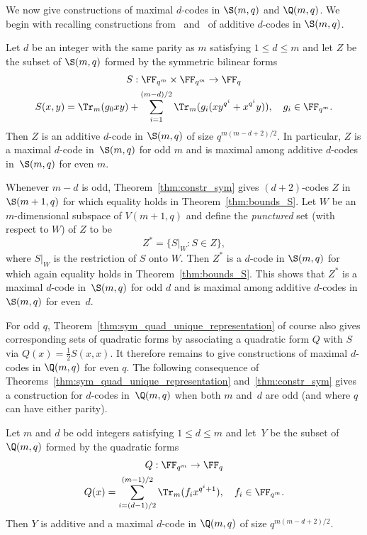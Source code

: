 We now give constructions of maximal $d$-codes in $\S(m,q)$ and $\Q(m,q)$. We begin with recalling constructions from~\cite{Sch2010} and~\cite{Sch2015} of additive $d$-codes in $\S(m,q)$.
\begin{theorem}
\label{thm:constr_sym}
Let $d$ be an integer with the same parity as $m$ satisfying $1\le d\le m$ and let $Z$ be the subset of $\S(m,q)$ formed by the symmetric bilinear forms
\begin{gather*}
S:\FF_{q^m}\times \FF_{q^m}\to\FF_q\\
S(x,y)=\Tr_m(g_0xy)+\sum_{i=1}^{(m-d)/2}\Tr_m(g_i(xy^{q^i}+x^{q^i}y)),\quad g_i\in\FF_{q^m}.
\end{gather*}
Then $Z$ is an additive $d$-code in $\S(m,q)$ of size $q^{m(m-d+2)/2}$. In particular, $Z$ is a maximal $d$-code in~$\S(m,q)$ for odd $m$ and is maximal among additive $d$-codes in~$\S(m,q)$ for even $m$.
\end{theorem}
\par
Whenever $m-d$ is odd, Theorem~\ref{thm:constr_sym} gives $(d+2)$-codes $Z$ in $\S(m+1,q)$ for which equality holds in Theorem~\ref{thm:bounds_S}. Let $W$ be an $m$-dimensional subspace of $V(m+1,q)$ and define the \emph{punctured} set (with respect to $W$) of $Z$ to be
\[
Z^*=\big\{S|_W:S\in Z\big\},
\] 
where $S|_W$ is the restriction of $S$ onto $W$. Then $Z^*$ is a $d$-code in $\S(m,q)$ for which again equality holds in Theorem~\ref{thm:bounds_S}. This shows that $Z^*$ is a maximal $d$-code in~$\S(m,q)$ for odd $d$ and is maximal among additive $d$-codes in~$\S(m,q)$ for even~$d$.
\par
For odd $q$, Theorem~\ref{thm:sym_quad_unique_representation} of course also gives corresponding sets of quadratic forms by associating a quadratic form $Q$ with $S$ via $Q(x)=\tfrac{1}{2}S(x,x)$. It therefore remains to give constructions of maximal $d$-codes in $\Q(m,q)$ for even $q$. The following consequence of Theorems~\ref{thm:sym_quad_unique_representation} and~\ref{thm:constr_sym} gives a construction for $d$-codes in~$\Q(m,q)$ when both $m$ and~$d$ are odd (and where $q$ can have either parity).
\begin{theorem}
\label{thm:constr_m_odd_d_odd}
Let $m$ and $d$ be odd integers satisfying $1\le d\le m$ and let~$Y$ be the subset of $\Q(m,q)$ formed by the quadratic forms
\begin{gather*}
Q:\FF_{q^m}\to\FF_q\\
Q(x)=\sum_{i=(d-1)/2}^{(m-1)/2}\Tr_m(f_ix^{q^i+1}),\quad f_i\in\FF_{q^m}.
\end{gather*}
Then $Y$ is additive and a maximal $d$-code in $\Q(m,q)$ of size $q^{m(m-d+2)/2}$.
\end{theorem}
